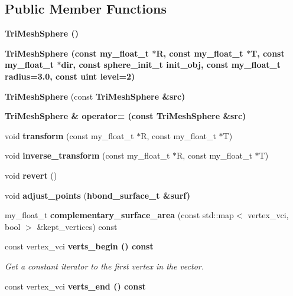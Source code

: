 \subsection*{Public Member Functions}
\begin{CompactItemize}
\item 
\bf{Tri\-Mesh\-Sphere} ()
\item 
\bf{Tri\-Mesh\-Sphere} (const my\_\-float\_\-t $\ast$R, const my\_\-float\_\-t $\ast$T, const my\_\-float\_\-t $\ast$dir, const \bf{sphere\_\-init\_\-t} init\_\-obj, const my\_\-float\_\-t radius=3.0, const uint level=2)
\item 
\textbf{Tri\-Mesh\-Sphere} (const \bf{Tri\-Mesh\-Sphere} \&src)\label{classSimSite3D_1_1geometry_1_1TriMeshSphere_b6396ee2c69154d55a327987b04c56b7}

\item 
\bf{Tri\-Mesh\-Sphere} \& \textbf{operator=} (const \bf{Tri\-Mesh\-Sphere} \&src)\label{classSimSite3D_1_1geometry_1_1TriMeshSphere_285b18dae29b3919d6516ced3f4a861c}

\item 
void \textbf{transform} (const my\_\-float\_\-t $\ast$R, const my\_\-float\_\-t $\ast$T)\label{classSimSite3D_1_1geometry_1_1TriMeshSphere_9e9bf1d856a40799f6fa385f8192427b}

\item 
void \textbf{inverse\_\-transform} (const my\_\-float\_\-t $\ast$R, const my\_\-float\_\-t $\ast$T)\label{classSimSite3D_1_1geometry_1_1TriMeshSphere_6a11da9e82a8ba89afb1ceaec4fd5e3e}

\item 
void \textbf{revert} ()\label{classSimSite3D_1_1geometry_1_1TriMeshSphere_baa72acd8f2096aa9995855d5d8c1375}

\item 
void \textbf{adjust\_\-points} (\bf{hbond\_\-surface\_\-t} \&surf)\label{classSimSite3D_1_1geometry_1_1TriMeshSphere_a550da12f3d525e8dc9472bb5c590fb8}

\item 
my\_\-float\_\-t \textbf{complementary\_\-surface\_\-area} (const std::map$<$ vertex\_\-vci, bool $>$ \&kept\_\-vertices) const \label{classSimSite3D_1_1geometry_1_1TriMeshSphere_453ba64dab8da3831126f9d89c948db6}

\item 
const vertex\_\-vci \bf{verts\_\-begin} () const \label{classSimSite3D_1_1geometry_1_1TriMeshSphere_3ee17324150856a0629eaf5eac7a388c}

\begin{CompactList}\small\item\em Get a constant iterator to the first vertex in the vector. \item\end{CompactList}\item 
const vertex\_\-vci \bf{verts\_\-end} () const \label{classSimSite3D_1_1geometry_1_1TriMeshSphere_edc98936bdb42ffbf98656b8caa6595a}


\end{CompactItemize}
